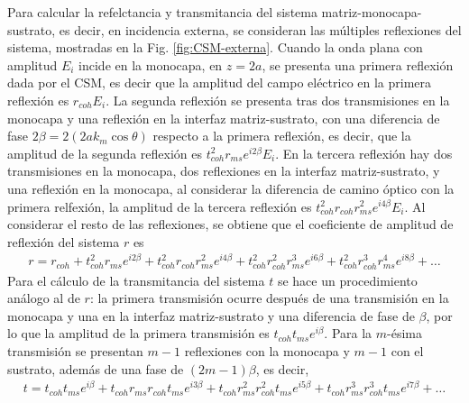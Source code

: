 Para calcular la refelctancia y transmitancia del sistema matriz-monocapa-sustrato, es decir, en incidencia externa, se consideran las múltiples reflexiones del sistema, mostradas en la Fig. \ref{fig:CSM-externa}. Cuando la onda plana con amplitud $E_i$ incide en la monocapa, en $z=2a$, se presenta una primera reflexión dada por el CSM, es decir que la amplitud del campo eléctrico en la primera reflexión es $r_{coh}E_i$. La segunda reflexión se presenta tras dos transmisiones en la monocapa y una reflexión en la interfaz matriz-sustrato, con una diferencia de fase $2\beta=2(2ak_m\cos\theta)$ respecto a la primera reflexión, es decir, que la amplitud de la segunda reflexión es $t_{coh}^2r_{ms}e^{i2\beta}E_i$. En la tercera reflexión hay dos transmisiones en la monocapa, dos reflexiones en la interfaz matriz-sustrato, y una reflexión en la monocapa, al considerar la diferencia de camino óptico con la primera relfexión, la amplitud de la tercera reflexión es $t_{coh}^2r_{coh}r_{ms}^2e^{i4\beta}E_i$. Al considerar el resto de las reflexiones, se obtiene que el coeficiente de amplitud de reflexión del sistema $r$ es
	\begin{align}
	r = r_{coh} +
		 t_{coh}^2r_{ms}e^{i2\beta}+
		 t_{coh}^2r_{coh}r_{ms}^2e^{i4\beta}+
		 t_{coh}^2r_{coh}^2r_{ms}^3e^{i6\beta}+
		 t_{coh}^2r_{coh}^3r_{ms}^4e^{i8\beta}+\ldots
	\label{eq:r_ext_span}
	\end{align}
Para el cálculo de la transmitancia del sistema $t$ se hace un procedimiento análogo al de $r$: la primera transmisión ocurre después de una transmisión en la monocapa y una en la interfaz matriz-sustrato y una diferencia de fase de $\beta$, por lo que la amplitud de la primera transmisión es $t_{coh}t_{ms}e^{i\beta}$. Para la $m$-ésima transmisión se presentan $m-1$ reflexiones con la monocapa y $m-1$ con el sustrato, además de una fase de $(2m-1)\beta$, es decir,
	\begin{align}
	t = t_{coh}t_{ms}e^{i\beta} +
		t_{coh}r_{ms}r_{coh}t_{ms}e^{i3\beta}+
		t_{coh}r_{ms}^2r_{coh}^2t_{ms}e^{i5\beta}+	
		t_{coh}r_{ms}^3r_{coh}^3t_{ms}e^{i7\beta}+ \ldots					
	\label{eq:t_ext_span}
	\end{align}

